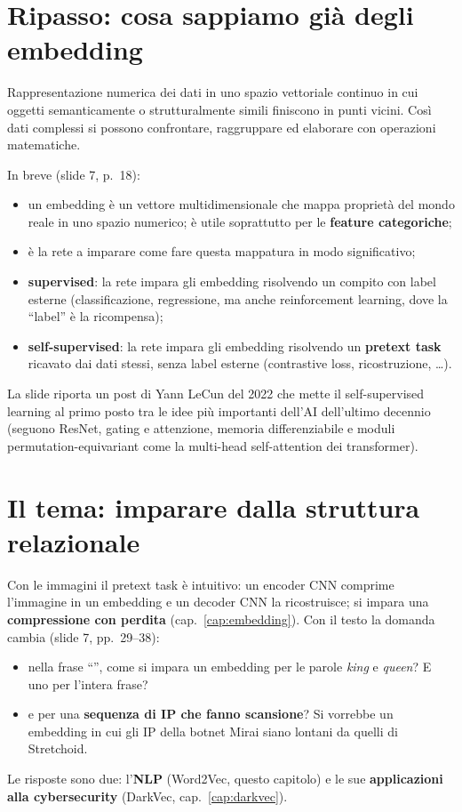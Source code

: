 \section{Ripasso: cosa sappiamo già degli embedding}
\begin{definizione}
Rappresentazione numerica dei dati in uno spazio vettoriale continuo in cui oggetti semanticamente o strutturalmente simili finiscono
in punti vicini. Così dati complessi si possono confrontare, raggruppare ed elaborare con operazioni matematiche.
\end{definizione}
In breve (slide 7, p.~18):
\begin{itemize}
  \item un embedding è un vettore multidimensionale che mappa proprietà del mondo reale in uno spazio numerico; è utile soprattutto per
        le \textbf{feature categoriche};
  \item è la rete a imparare come fare questa mappatura in modo significativo;
  \item \textbf{supervised}: la rete impara gli embedding risolvendo un compito con label esterne (classificazione, regressione, ma
        anche reinforcement learning, dove la ``label'' è la ricompensa);
  \item \textbf{self-supervised}: la rete impara gli embedding risolvendo un \textbf{pretext task} ricavato dai dati stessi, senza label
        esterne (contrastive loss, ricostruzione, \ldots).
\end{itemize}
La slide riporta un post di Yann LeCun del 2022 che mette il self-supervised learning al primo posto tra le idee più importanti
dell'AI dell'ultimo decennio (seguono ResNet, gating e attenzione, memoria differenziabile e moduli permutation-equivariant come la
multi-head self-attention dei transformer).

\section{Il tema: imparare dalla struttura relazionale}
Con le immagini il pretext task è intuitivo: un encoder CNN comprime l'immagine in un embedding e un decoder CNN la ricostruisce; si
impara una \textbf{compressione con perdita} (cap.~\ref{cap:embedding}). Con il testo la domanda cambia (slide 7, pp.~29--38):
\begin{itemize}
  \item nella frase ``'', come si impara un embedding per le parole \emph{king} e
        \emph{queen}? E uno per l'intera frase?
  \item e per una \textbf{sequenza di IP che fanno scansione}? Si vorrebbe un embedding in cui gli IP della botnet Mirai siano lontani da
        quelli di Stretchoid.
\end{itemize}
Le risposte sono due: l'\textbf{NLP} (Word2Vec, questo capitolo) e le sue \textbf{applicazioni alla cybersecurity} (DarkVec,
cap.~\ref{cap:darkvec}).

